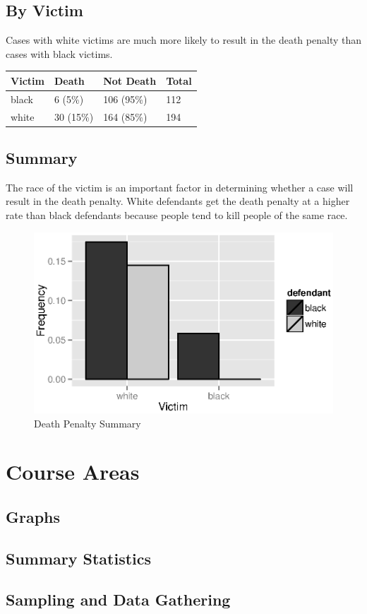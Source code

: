 \documentclass{exam}
\begin{document}
  \subsection{By Victim}

  Cases with white victims are much more likely to result in the death penalty than cases with black victims.
  \begin{table}[H]
    \centering
    \begin{tabular}{llll}
      \toprule
      Victim & Death     & Not Death  & Total \\
      \midrule
      black  & 6 (5\%)   & 106 (95\%) & 112 \\
      white  & 30 (15\%) & 164 (85\%) & 194 \\
      \bottomrule
    \end{tabular}
  \end{table}

  \subsection{Summary}
  The race of the victim is an important factor in determining whether a case will result in the death penalty.  White
  defendants get the death penalty at a higher rate than black defendants because people tend to kill people of the same
  race.

  \begin{figure}[H]
    \centering
    \includegraphics[scale = 0.9]{death_penalty.eps}
    \caption{Death Penalty Summary}
  \end{figure}

  \section{Course Areas}

  \subsection{Graphs}

  \subsection{Summary Statistics}

  \subsection{Sampling and Data Gathering}
\end{document}
